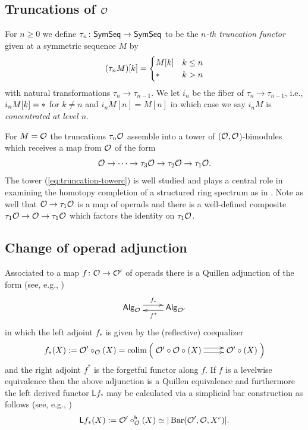 \subsection{Truncations of $\mathcal{O}$} \label{sec:trunc}
For $n\geq 0$ we define $\tau_n\colon \mathsf{SymSeq}\to \mathsf{SymSeq}$ to be the \textit{$n$-th truncation functor} given at a symmetric sequence $M$ by \begin{equation*} 
(\tau_n M)[k] = \begin{cases} M[k] & k\leq n \\ * & k > n\end{cases} \end{equation*}
with natural transformations $\tau_n\to\tau_{n-1}$. We let $i_n$ be the fiber of $\tau_n\to \tau_{n-1}$, i.e., $i_n M [k] = *$ for $k\neq n$ and $i_n M[n]=M[n]$ in which case we say $i_nM$ is \textit{concentrated at level $n$}.

For $M=\mathcal{O}$ the truncations $\tau_n \mathcal{O}$ assemble into a tower of $(\mathcal{O},\mathcal{O}$)-bimodules which receives a map from $\mathcal{O}$ of the form \begin{equation} \label{eq:truncation-towerc} 
\mathcal{O}\to \cdots \to \tau_3 \mathcal{O} \to \tau_2 \mathcal{O} \to \tau_1 \mathcal{O}.
\end{equation}
The tower (\ref{eq:truncation-towerc}) is well studied and plays a central role in examining the homotopy completion of a structured ring spectrum as in \cite{Har-Hess}. Note as well that $\mathcal{O}\to \tau_1\mathcal{O}$ is a map of operads and there is a well-defined composite $\tau_1\mathcal{O}\to\mathcal{O}\to \tau_1\mathcal{O}$ which factors the identity on $\tau_1\mathcal{O}$.

\subsection{Change of operad adjunction} \label{change-of-Op} Associated to a map $f\colon \mathcal{O}\to\mathcal{O}'$ of operads there is a Quillen adjunction of the form (see, e.g.,  \cite{Rezk-thesis}) \begin{equation*} 
    \xymatrix{
    \Alg{O} \ar@<.75 ex>[r]^{f_*} &
    \Alg{O'} \ar@<.75 ex>[l]^{f^*}
    }
\end{equation*}
in which the left adjoint $f_*$ is given by the (reflective) coequalizer \[f_*(X):=\Cal{O'} \circ_{\Cal{O}} (X)=\colim \left(\xymatrix{ \Cal{O}'\circ\Cal{O}\circ(X)\ar@<.75ex>[r] \ar@<-.5ex>[r] & \Cal{O}'\circ (X) } \right)\] and the right adjoint $f^*$ is the forgetful functor along $f$. If $f$ is a levelwise equivalence then the above adjunction is a Quillen equivalence and furthermore the left derived functor $\mathsf{L}f_*$ may be calculated via a simplicial bar construction as follows (see, e.g.,  \cite{Har-1})  \begin{equation*}
    \mathsf{L}f_*(X):= \mathcal{O}' \circ^{\mathsf{h}}_{\mathcal{O}}(X)\simeq |\operatorname{Bar}(\mathcal{O}', \mathcal{O}, X^c)|.
\end{equation*}

